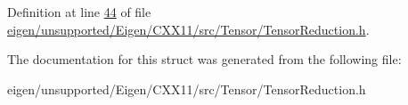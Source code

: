 Definition at line \hyperlink{eigen_2unsupported_2_eigen_2_c_x_x11_2src_2_tensor_2_tensor_reduction_8h_source_l00044}{44} of file \hyperlink{eigen_2unsupported_2_eigen_2_c_x_x11_2src_2_tensor_2_tensor_reduction_8h_source}{eigen/unsupported/\+Eigen/\+C\+X\+X11/src/\+Tensor/\+Tensor\+Reduction.\+h}.



The documentation for this struct was generated from the following file\+:\begin{DoxyCompactItemize}
\item 
eigen/unsupported/\+Eigen/\+C\+X\+X11/src/\+Tensor/\+Tensor\+Reduction.\+h\end{DoxyCompactItemize}
